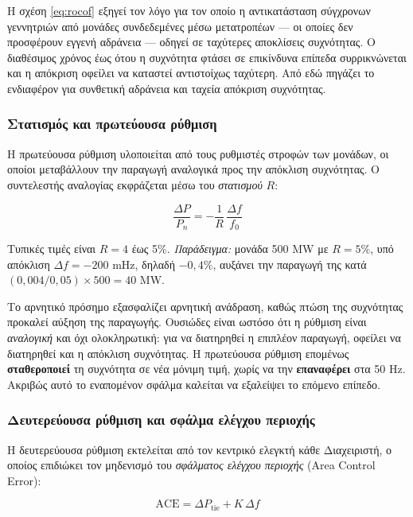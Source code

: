 Η σχέση \eqref{eq:rocof} εξηγεί τον λόγο για τον οποίο η αντικατάσταση σύγχρονων
γεννητριών από μονάδες συνδεδεμένες μέσω μετατροπέων — οι οποίες δεν προσφέρουν εγγενή
αδράνεια — οδηγεί σε ταχύτερες αποκλίσεις συχνότητας. Ο διαθέσιμος χρόνος έως ότου η
συχνότητα φτάσει σε επικίνδυνα επίπεδα συρρικνώνεται και η απόκριση οφείλει να καταστεί
αντιστοίχως ταχύτερη. Από εδώ πηγάζει το ενδιαφέρον για συνθετική αδράνεια και ταχεία
απόκριση συχνότητας.

\subsubsection*{Στατισμός και πρωτεύουσα ρύθμιση}

Η πρωτεύουσα ρύθμιση υλοποιείται από τους ρυθμιστές στροφών των μονάδων, οι οποίοι
μεταβάλλουν την παραγωγή αναλογικά προς την απόκλιση συχνότητας. Ο συντελεστής αναλογίας
εκφράζεται μέσω του \emph{στατισμού} $R$:

\begin{equation}
\frac{\Delta P}{P_n} = -\frac{1}{R}\,\frac{\Delta f}{f_0}
\label{eq:droop}
\end{equation}

Τυπικές τιμές είναι $R = 4$ έως 5\%. \emph{Παράδειγμα:} μονάδα 500 MW με $R = 5\%$, υπό
απόκλιση $\Delta f = -200$ mHz, δηλαδή $-0{,}4\%$, αυξάνει την παραγωγή της κατά
$(0{,}004/0{,}05) \times 500 = 40$ MW.

Το αρνητικό πρόσημο εξασφαλίζει αρνητική ανάδραση, καθώς πτώση της συχνότητας προκαλεί
αύξηση της παραγωγής. Ουσιώδες είναι ωστόσο ότι η ρύθμιση είναι \emph{αναλογική} και όχι
ολοκληρωτική: για να διατηρηθεί η επιπλέον παραγωγή, οφείλει να διατηρηθεί και η απόκλιση
συχνότητας. Η πρωτεύουσα ρύθμιση επομένως \textbf{σταθεροποιεί} τη συχνότητα σε νέα μόνιμη
τιμή, χωρίς να την \textbf{επαναφέρει} στα 50 Hz. Ακριβώς αυτό το εναπομένον σφάλμα
καλείται να εξαλείψει το επόμενο επίπεδο.

\subsubsection*{Δευτερεύουσα ρύθμιση και σφάλμα ελέγχου περιοχής}

Η δευτερεύουσα ρύθμιση εκτελείται από τον κεντρικό ελεγκτή κάθε Διαχειριστή, ο οποίος
επιδιώκει τον μηδενισμό του \emph{σφάλματος ελέγχου περιοχής} (Area Control Error):

\begin{equation}
\mathrm{ACE} = \Delta P_{\mathrm{tie}} + K \, \Delta f
\label{eq:ace}
\end{equation}

